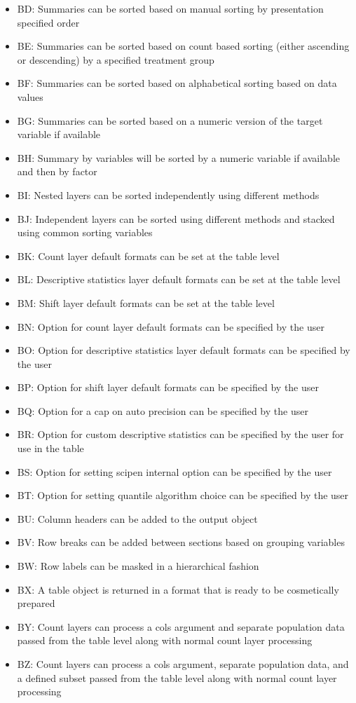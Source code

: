 \documentclass[
]{article}
\begin{document}
\begin{itemize}
\item
  BD: Summaries can be sorted based on manual sorting by presentation
  specified order
\item
  BE: Summaries can be sorted based on count based sorting (either
  ascending or descending) by a specified treatment group
\item
  BF: Summaries can be sorted based on alphabetical sorting based on
  data values
\item
  BG: Summaries can be sorted based on a numeric version of the target
  variable if available
\item
  BH: Summary by variables will be sorted by a numeric variable if
  available and then by factor
\item
  BI: Nested layers can be sorted independently using different methods
\item
  BJ: Independent layers can be sorted using different methods and
  stacked using common sorting variables
\item
  BK: Count layer default formats can be set at the table level
\item
  BL: Descriptive statistics layer default formats can be set at the
  table level
\item
  BM: Shift layer default formats can be set at the table level
\item
  BN: Option for count layer default formats can be specified by the
  user
\item
  BO: Option for descriptive statistics layer default formats can be
  specified by the user
\item
  BP: Option for shift layer default formats can be specified by the
  user
\item
  BQ: Option for a cap on auto precision can be specified by the user
\item
  BR: Option for custom descriptive statistics can be specified by the
  user for use in the table
\item
  BS: Option for setting scipen internal option can be specified by the
  user
\item
  BT: Option for setting quantile algorithm choice can be specified by
  the user
\item
  BU: Column headers can be added to the output object
\item
  BV: Row breaks can be added between sections based on grouping
  variables
\item
  BW: Row labels can be masked in a hierarchical fashion
\item
  BX: A table object is returned in a format that is ready to be
  cosmetically prepared
\item
  BY: Count layers can process a cols argument and separate population
  data passed from the table level along with normal count layer
  processing
\item
  BZ: Count layers can process a cols argument, separate population
  data, and a defined subset passed from the table level along with
  normal count layer processing
\end{itemize}
\end{document}
